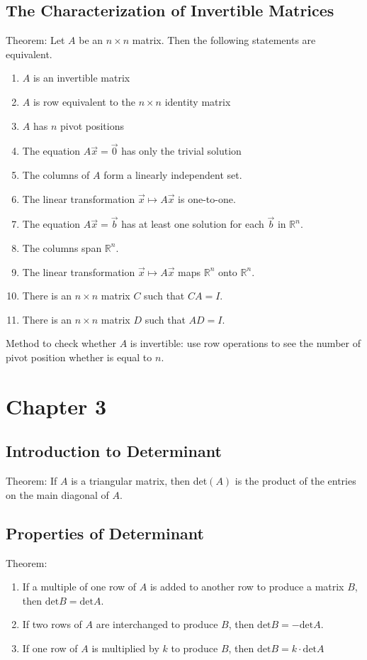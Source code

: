 \documentclass[12pt]{article}
\begin{document}
\subsection{The Characterization of Invertible Matrices}
Theorem: Let $A$ be an $n\times n$ matrix. Then the following statements are equivalent.
\begin{enumerate}
    \item $A$ is an invertible matrix
    \item $A$ is row equivalent to the $n\times n$ identity matrix
    \item $A$ has $n$ pivot positions
    \item The equation $A\vec{x} = \vec{0}$ has only the trivial solution
    \item The columns of $A$ form a linearly independent set.
    \item The linear transformation $\vec{x} \longmapsto A\vec{x}$ is one-to-one.
    \item The equation $A\vec{x} =\vec{b}$ has at least one solution for each $\vec{b}$ in $\mathbb{R}^n$.
    \item The columns span $\mathbb{R}^n$.
    \item The linear transformation $\vec{x} \longmapsto A\vec{x}$ maps $\mathbb{R}^n$ onto $\mathbb{R}^n$.
    \item There is an $n \times n$ matrix $C$ such that $CA = I$.
    \item There is an $n \times n$ matrix $D$ such that $AD = I$.
\end{enumerate}


Method to check whether $A$ is invertible: use row operations to see the number of pivot position whether is equal to $n$.


\section{Chapter 3}
\subsection{Introduction to Determinant}
Theorem: If $A$ is a triangular matrix, then det$(A)$ is the product of the entries on the main diagonal of $A$. 


\subsection{Properties of Determinant}
Theorem:
\begin{enumerate}
    \item If a multiple of one row of $A$ is added to another row to produce a matrix $B$, then $\text{det}B = \text{det}A$.
    \item If two rows of $A$ are interchanged to produce $B$, then $\text{det}B = -\text{det}A$.
    \item If one row of $A$ is multiplied by $k$ to produce $B$, then $\text{det}B = k\cdot\text{det}A$
\end{enumerate}
\end{document}

